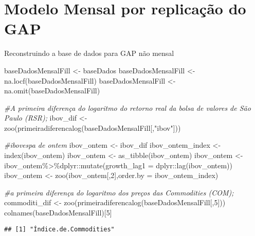 \documentclass[
]{article}
\newenvironment{Shaded}{\begin{snugshade}}{\end{snugshade}}
\newcommand{\AttributeTok}[1]{\textcolor[rgb]{0.77,0.63,0.00}{#1}}
\newcommand{\CommentTok}[1]{\textcolor[rgb]{0.56,0.35,0.01}{\textit{#1}}}
\newcommand{\DecValTok}[1]{\textcolor[rgb]{0.00,0.00,0.81}{#1}}
\newcommand{\FunctionTok}[1]{\textcolor[rgb]{0.00,0.00,0.00}{#1}}
\newcommand{\NormalTok}[1]{#1}
\newcommand{\OtherTok}[1]{\textcolor[rgb]{0.56,0.35,0.01}{#1}}
\newcommand{\SpecialCharTok}[1]{\textcolor[rgb]{0.00,0.00,0.00}{#1}}
\newcommand{\StringTok}[1]{\textcolor[rgb]{0.31,0.60,0.02}{#1}}
\begin{document}
\hypertarget{modelo-mensal-por-replicauxe7uxe3o-do-gap}{%
\section{Modelo Mensal por replicação do
GAP}\label{modelo-mensal-por-replicauxe7uxe3o-do-gap}}

Reconstruindo a base de dados para GAP não mensal

\begin{Shaded}
\begin{Highlighting}[]
\NormalTok{baseDadosMensalFill }\OtherTok{\textless{}{-}}\NormalTok{ baseDados}
\NormalTok{baseDadosMensalFill }\OtherTok{\textless{}{-}} \FunctionTok{na.locf}\NormalTok{(baseDadosMensalFill)}
\NormalTok{baseDadosMensalFill }\OtherTok{\textless{}{-}} \FunctionTok{na.omit}\NormalTok{(baseDadosMensalFill)}

\CommentTok{\#A primeira diferença do logaritmo do retorno real da bolsa de valores de São Paulo (RSR);}
\NormalTok{ibov\_dif }\OtherTok{\textless{}{-}} \FunctionTok{zoo}\NormalTok{(}\FunctionTok{primeiradiferencalog}\NormalTok{(baseDadosMensalFill[,}\StringTok{"ibov"}\NormalTok{]))}

\CommentTok{\#ibovespa de ontem}
\NormalTok{ibov\_ontem }\OtherTok{\textless{}{-}}\NormalTok{ ibov\_dif}
\NormalTok{ibov\_ontem\_index }\OtherTok{\textless{}{-}} \FunctionTok{index}\NormalTok{(ibov\_ontem)}
\NormalTok{ibov\_ontem }\OtherTok{\textless{}{-}} \FunctionTok{as\_tibble}\NormalTok{(ibov\_ontem)}
\NormalTok{ibov\_ontem }\OtherTok{\textless{}{-}}\NormalTok{ ibov\_ontem}\SpecialCharTok{\%\textgreater{}\%}\NormalTok{dplyr}\SpecialCharTok{::}\FunctionTok{mutate}\NormalTok{(}\AttributeTok{growth\_lag1 =}\NormalTok{ dplyr}\SpecialCharTok{::}\FunctionTok{lag}\NormalTok{(ibov\_ontem))}
\NormalTok{ibov\_ontem }\OtherTok{\textless{}{-}} \FunctionTok{zoo}\NormalTok{(ibov\_ontem[,}\DecValTok{2}\NormalTok{],}\AttributeTok{order.by =}\NormalTok{ ibov\_ontem\_index)}

\CommentTok{\#a primeira diferença do logaritmo dos preços das Commodities (COM);}
\NormalTok{commoditi\_dif }\OtherTok{\textless{}{-}} \FunctionTok{zoo}\NormalTok{(}\FunctionTok{primeiradiferencalog}\NormalTok{(baseDadosMensalFill[,}\DecValTok{5}\NormalTok{]))}
\FunctionTok{colnames}\NormalTok{(baseDadosMensalFill)[}\DecValTok{5}\NormalTok{]}
\end{Highlighting}
\end{Shaded}

\begin{verbatim}
## [1] "Índice.de.Commodities"
\end{verbatim}
\end{document}
